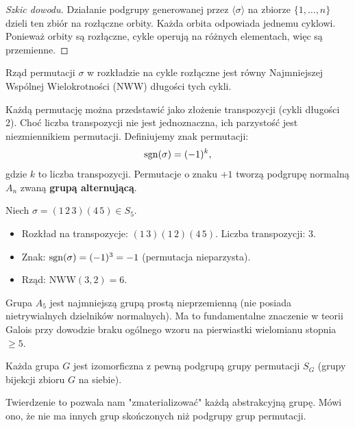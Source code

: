 \begin{proof}[Szkic dowodu]
Działanie podgrupy generowanej przez $\langle \sigma \rangle$ na zbiorze $\{1, \dots, n\}$ dzieli ten zbiór na rozłączne orbity. Każda orbita odpowiada jednemu cyklowi. Ponieważ orbity są rozłączne, cykle operują na różnych elementach, więc są przemienne.
\end{proof}

\begin{fact}
Rząd permutacji $\sigma$ w rozkładzie na cykle rozłączne jest równy Najmniejszej Wspólnej Wielokrotności (NWW) długości tych cykli.
\end{fact}

\begin{theorem}
Każdą permutację można przedstawić jako złożenie transpozycji (cykli długości 2). Choć liczba transpozycji nie jest jednoznaczna, ich parzystość jest niezmiennikiem permutacji.
Definiujemy znak permutacji:
\[ \operatorname{sgn}(\sigma) = (-1)^k, \]
gdzie $k$ to liczba transpozycji. Permutacje o znaku $+1$ tworzą podgrupę normalną $A_n$ zwaną \textbf{grupą alternującą}.
\end{theorem}

\begin{eg}
Niech $\sigma = (1\, 2\, 3)(4\, 5) \in S_5$.
\begin{itemize}
    \item Rozkład na transpozycje: $(1\, 3)(1\, 2)(4\, 5)$. Liczba transpozycji: 3.
    \item Znak: $\operatorname{sgn}(\sigma) = (-1)^3 = -1$ (permutacja nieparzysta).
    \item Rząd: $\text{NWW}(3, 2) = 6$.
\end{itemize}
\end{eg}

\begin{note}
Grupa $A_5$ jest najmniejszą grupą prostą nieprzemienną (nie posiada nietrywialnych dzielników normalnych). Ma to fundamentalne znaczenie w teorii Galois przy dowodzie braku ogólnego wzoru na pierwiastki wielomianu stopnia $\ge 5$.
\end{note}

\begin{theorem}
Każda grupa $G$ jest izomorficzna z pewną podgrupą grupy permutacji $S_G$ (grupy bijekcji zbioru $G$ na siebie).
\end{theorem}

Twierdzenie to pozwala nam "zmaterializować" każdą abstrakcyjną grupę. Mówi ono, że nie ma innych grup skończonych niż podgrupy grup permutacji.

